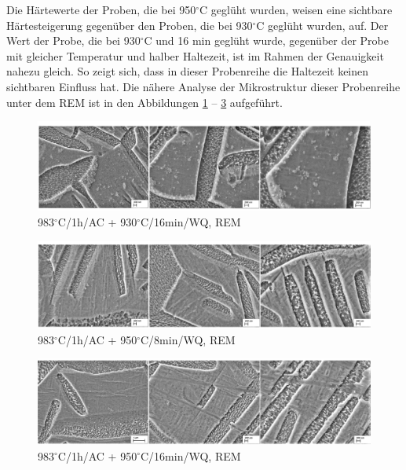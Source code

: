 Die Härtewerte der Proben, die bei 950$^\circ$C geglüht wurden, weisen eine sichtbare Härtesteigerung gegenüber den Proben, die bei 930$^\circ$C geglüht wurden, auf. Der Wert der Probe, die bei 930$^\circ$C und 16 min geglüht wurde, gegenüber der Probe mit gleicher Temperatur und halber Haltezeit, ist im Rahmen der Genauigkeit nahezu gleich. So zeigt sich, dass in dieser Probenreihe die Haltezeit keinen sichtbaren Einfluss hat. Die nähere Analyse der Mikrostruktur dieser Probenreihe unter dem REM ist in den Abbildungen \ref{fig:abbildung-16} -- \ref{fig:abbildung-18} aufgeführt.

\begin{figure}
	\centering
	\includegraphics[width=1.0\linewidth]{./Bilder/Abbildung 16.png}
	\caption[Abbildung 16]{983$^\circ$C/1h/AC + 930$^\circ$C/16min/WQ, REM}
	\label{fig:abbildung-16}
\end{figure}

\begin{figure}
	\centering
	\includegraphics[width=1.0\linewidth]{./Bilder/Abbildung 17.png}
	\caption[Abbildung 17]{983$^\circ$C/1h/AC + 950$^\circ$C/8min/WQ, REM}
	\label{fig:abbildung-17}
\end{figure}

\begin{figure}
	\centering
	\includegraphics[width=1.0\linewidth]{./Bilder/Abbildung 18.png}
	\caption[Abbildung 18]{983$^\circ$C/1h/AC + 950$^\circ$C/16min/WQ, REM}
	\label{fig:abbildung-18}
\end{figure}

